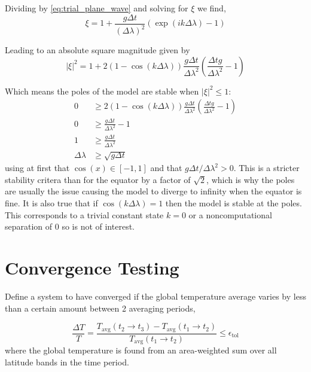 \documentclass[12pt, onecolumn]{revtex4-2}    %
\begin{document}
Dividing by \eqref{eq:trial_plane_wave} and solving for $\xi$ we find,
\begin{equation}
    \xi = 1 + \frac{g\Delta t}{(\Delta \lambda)^2}\left(\exp(i k \Delta \lambda) - 1\right)
\end{equation}

Leading to an absolute square magnitude given by
\begin{equation}
    |\xi|^2 = 1 + 2 (1-\cos(k\Delta\lambda)) \frac{g \Delta t}{\Delta \lambda ^2}\left(\frac{\Delta t g}{\Delta \lambda ^2} - 1\right)
\end{equation}

Which means the poles of the model are stable when $|\xi|^2 \le 1$:
\begin{align*}
    0              & \ge 2(1-\cos(k\Delta\lambda)) \frac{g \Delta t}{\Delta \lambda ^2}\left(\frac{\Delta t g}{\Delta \lambda ^2} - 1\right) \\
    0              & \ge \frac{g \Delta t}{\Delta \lambda ^2} - 1                                                                            \\
    1              & \ge \frac{g \Delta t}{\Delta \lambda ^2}                                                                                \\
    \Delta \lambda & \ge \sqrt{g \Delta t}
\end{align*}
using at first that $\cos(x) \in [-1, 1]$ and that $g \Delta t / \Delta\lambda^2 > 0$.
This is a stricter stability critera than for the equator by a factor of $\sqrt{2}$, which is why the poles are usually the issue causing the model to diverge to infinity when the equator is fine.
It is also true that if $\cos(k\Delta\lambda) = 1$ then the model is stable at the poles.
This corresponds to a trivial constant state $k = 0$ or a noncomputational separation of $0$ so is not of interest.

\section{Convergence Testing} \label{sec:conv_testing}

Define a system to have converged if the global temperature average varies by less than a certain amount between 2 averaging periods,

\begin{equation*}
    \frac{\Delta T}{T} = \frac{T_{\text{avg}}(t_2 \to t_3) - T_{\text{avg}}(t_1 \to t_2)}{T_{\text{avg}}(t_1 \to t_2)}
    \le \epsilon_{\text{tol}}
\end{equation*}
where the global temperature is found from an area-weighted sum over all latitude bands in the time period.
\end{document}
